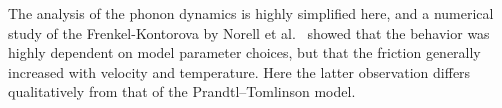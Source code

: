 The analysis of the phonon dynamics is highly simplified here, and a numerical study of the Frenkel-Kontorova by Norell et al.~\cite{FK2D} showed that the behavior was highly dependent on model parameter choices, but that the friction generally increased with velocity and temperature. Here the latter observation differs qualitatively from that of the Prandtl–Tomlinson model.
























